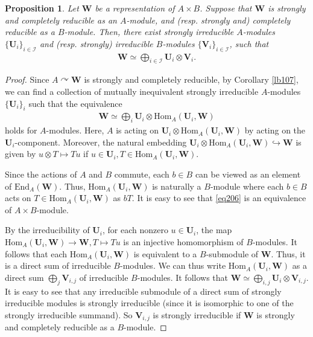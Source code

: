 \documentclass[12pt,a4paper,notitlepage]{report}
\theoremstyle{definition}
\theoremstyle{plain}
\newtheorem{pp}[df]{Proposition}
\newcommand{\mc}{\mathcal}
\newcommand{\End}{\mathrm{End}} %
\newcommand{\Hom}{\mathrm{Hom}}
\newcommand{\mbf}{\mathbf}
\numberwithin{equation}{section}
\begin{document}
\begin{pp}\label{lb101}
Let $\mbf W$ be a   representation of $A\times B$. Suppose that $\mbf W$ is strongly and completely reducible as an $A$-module, and (resp. strongly and) completely reducible  as a $B$-module. Then, there exist  strongly irreducible $A$-modules $\{\mbf U_i\}_{i\in\mc I}$ and (resp. strongly) irreducible $B$-modules $\{\mbf V_i\}_{i\in\mc I}$, such that
\begin{align*}
\mbf W\simeq\bigoplus_{i\in\mc I} \mbf U_i\otimes\mbf V_i.
\end{align*}
\end{pp}



\begin{proof}
Since $A\curvearrowright\mbf W$ is strongly and completely reducible, by Corollary \ref{lb107}, we can find a collection of mutually inequivalent strongly irreducible $A$-modules $\{\mbf U_i\}_i$ such that the equivalence
\begin{align}
\mbf W\simeq\bigoplus_i\mbf U_i\otimes \Hom_A(\mbf U_i,\mbf W)\label{eq206}
\end{align}
holds for $A$-modules. Here, $A$ is acting on $\mbf U_i\otimes \Hom_A(\mbf U_i,\mbf W)$ by acting on the $\mbf U_i$-component. Moreover, the natural embedding $\mbf U_i\otimes \Hom_A(\mbf U_i,\mbf W)\hookrightarrow\mbf W$ is given by $u\otimes T\mapsto Tu$ if $u\in\mbf U_i,T\in \Hom_A(\mbf U_i,\mbf W)$. 
	
Since the actions of $A$ and $B$ commute, each $b\in B$ can be viewed as an element of $\End_A(\mbf W)$. Thus, $\Hom_A(\mbf U_i,\mbf W)$ is naturally a $B$-module where each $b\in B$ acts on $T\in \Hom_A(\mbf U_i,\mbf W)$ as $bT$. It is easy to see that \eqref{eq206} is an equivalence of $A\times B$-module. 

By the irreducibility of $\mbf U_i$, for each nonzero $u\in\mbf U_i$, the map $\Hom_A(\mbf U_i,\mbf W)\rightarrow\mbf W,T\mapsto Tu$ is an injective homomorphism of $B$-modules. It follows that each $\Hom_A(\mbf U_i,\mbf W)$ is  equivalent to a $B$-submodule of $\mbf W$. Thus, it is a direct sum of  irreducible $B$-modules. We can thus write $\Hom_A(\mbf U_i,\mbf W)$ as a  direct sum $\bigoplus_j\mbf V_{i,j}$ of  irreducible $B$-modules. It follows that $\mbf W\simeq\bigoplus_{i,j}\mbf U_i\otimes\mbf V_{i,j}$. It is easy to see that any irreducible submodule of a direct sum of strongly irreducible modules is strongly irreducible (since it is isomorphic to one of the strongly irreducible summand). So $\mbf V_{i,j}$ is strongly irreducible if $\mbf W$ is strongly and completely reducible as a $B$-module.
\end{proof}
\end{document}
